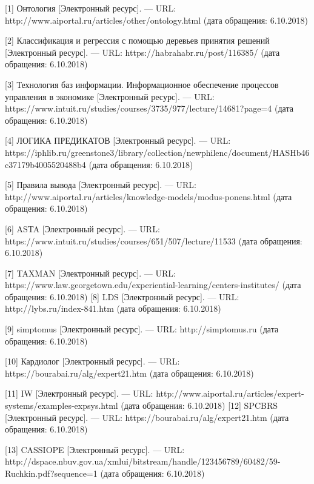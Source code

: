 \documentclass[14pt,a4paper,report]{report}
\begin{document}
\begin{flushleft}

[1] Онтология [Электронный ресурс]. — URL: http://www.aiportal.ru/articles/other/ontology.html (дата обращения: 6.10.2018)

[2] Классификация и регрессия с помощью деревьев принятия решений [Электронный ресурс]. — URL: https://habrahabr.ru/post/116385/ (дата обращения: 6.10.2018)

[3] Технология баз информации. Информационное обеспечение процессов управления в экономике [Электронный ресурс]. — URL: https://www.intuit.ru/studies/courses/3735/977/lecture/14681?page=4 (дата обращения: 6.10.2018)

[4] ЛОГИКА ПРЕДИКАТОВ [Электронный ресурс]. — URL: https://iphlib.ru/greenstone3/library/collection/newphilenc/document/HASHb46c37179b4005520488b4 (дата обращения: 6.10.2018)

[5] Правила вывода [Электронный ресурс]. — URL: http://www.aiportal.ru/articles/knowledge-models/modus-ponens.html (дата обращения: 6.10.2018)


[6] ASTA [Электронный ресурс]. — URL: https://www.intuit.ru/studies/courses/651/507/lecture/11533 (дата обращения: 6.10.2018)

[7] TAXMAN [Электронный ресурс]. — URL: https://www.law.georgetown.edu/experiential-learning/centers-institutes/ (дата обращения: 6.10.2018)
[8] LDS [Электронный ресурс]. — URL: http://lybs.ru/index-841.htm (дата обращения: 6.10.2018)

[9] simptomus [Электронный ресурс]. — URL: http://simptomus.ru (дата обращения: 6.10.2018)

[10] Кардиолог [Электронный ресурс]. — URL: https://bourabai.ru/alg/expert21.htm (дата обращения: 6.10.2018)

[11] IW [Электронный ресурс]. — URL: http://www.aiportal.ru/articles/expert-systems/examples-expsys.html (дата обращения: 6.10.2018)
[12] SPCBRS [Электронный ресурс]. — URL: https://bourabai.ru/alg/expert21.htm (дата обращения: 6.10.2018)



[13] CASSIOPE [Электронный ресурс]. — URL: http://dspace.nbuv.gov.ua/xmlui/bitstream/handle/123456789/60482/59-Ruchkin.pdf?sequence=1 (дата обращения: 6.10.2018)



\end{flushleft}
\end{document}
